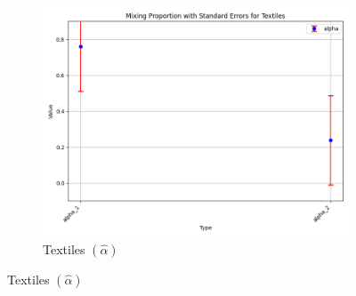 \documentclass{article}
\begin{document}
\begin{figure}[ht!]
    \begin{subfigure}[t]{0.32\textwidth}
        \centering
        \includegraphics[width=\textwidth]{figure/empirical_stat_normal_alpha_with_error_bars_Textiles.png}
        \caption{Textiles $(\hat\alpha)$}
    \end{subfigure}


\end{figure}
\end{document}

